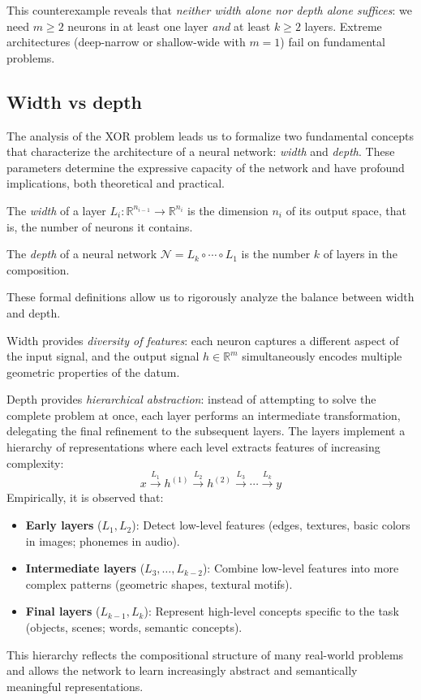 This counterexample reveals that \textit{neither width alone nor depth alone suffices}: we need $m \geq 2$ neurons in at least one layer \textit{and} at least $k \geq 2$ layers. Extreme architectures (deep-narrow or shallow-wide with $m=1$) fail on fundamental problems.


\subsection{Width vs depth}\label{subsec:anchura_profundidad}

The analysis of the XOR problem leads us to formalize two fundamental concepts that characterize the architecture of a neural network: \textit{width} and \textit{depth}. These parameters determine the expressive capacity of the network and have profound implications, both theoretical and practical.

\begin{definition}\label{def:anchura}
The \textit{width} of a layer $L_i: \mathbb{R}^{n_{i-1}} \to \mathbb{R}^{n_i}$ is the dimension $n_i$ of its output space, that is, the number of neurons it contains.
\end{definition}

\begin{definition}\label{def:profundidad}
The \textit{depth} of a neural network $\mathcal{N} = L_k \circ \cdots \circ L_1$ is the number $k$ of layers in the composition.
\end{definition}

These formal definitions allow us to rigorously analyze the balance between width and depth.

Width provides \textit{diversity of features}: each neuron captures a different aspect of the input signal, and the output signal $h \in \mathbb{R}^m$ simultaneously encodes multiple geometric properties of the datum.

Depth provides \textit{hierarchical abstraction}: instead of attempting to solve the complete problem at once, each layer performs an intermediate transformation, delegating the final refinement to the subsequent layers. The layers implement a hierarchy of representations where each level extracts features of increasing complexity:
\[
x \xrightarrow{L_1} h^{(1)} \xrightarrow{L_2} h^{(2)} \xrightarrow{L_3} \cdots \xrightarrow{L_k} y
\]
Empirically, it is observed that:
\begin{itemize}
    \item \textbf{Early layers} ($L_1, L_2$): Detect low-level features (edges, textures, basic colors in images; phonemes in audio).
    \item \textbf{Intermediate layers} ($L_3, \ldots, L_{k-2}$): Combine low-level features into more complex patterns (geometric shapes, textural motifs).
    \item \textbf{Final layers} ($L_{k-1}, L_k$): Represent high-level concepts specific to the task (objects, scenes; words, semantic concepts).
\end{itemize}
This hierarchy reflects the compositional structure of many real-world problems and allows the network to learn increasingly abstract and semantically meaningful representations.

